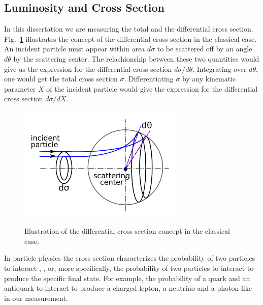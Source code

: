\subsection{Luminosity and Cross Section}

In this dissertation we are measuring the total and the differential cross section. Fig.~\ref{fig:CSclassical} illustrates the concept of the differential cross section in the classical case. An incident particle must appear within area $d\sigma$ to be scattered off by an angle $d\theta$ by the scattering center. The relashionship between these two quantities would give us the expression for the differential cross section $d\sigma/d\theta$. Integrating over $d\theta$, one would get the total cross section $\sigma$. Differentiating $\sigma$ by any kinematic parameter $X$ of the incident particle would give the expression for the differential cross section $d\sigma/dX$.\\

\begin{figure}[htb]
  \begin{center}
    {\includegraphics[width=0.70\textwidth]{../figs/WgAbout/CSclassical.png}}
    \caption{Illustration of the differential cross section concept in the classical case.}
    \label{fig:CSclassical}
  \end{center}
\end{figure}


In particle physics the cross section characterizes the probability of two particles to interact \cite{ref_Griffiths}, \cite{ref_Halzen_Martin}, \cite{ref_CS_wiki} or, more specifically, the probability of two particles to interact to produce the specific final state. For example, the probability of a quark and an antiquark to interact to produce a charged lepton, a neutrino and a photon like in our measurement.\\


